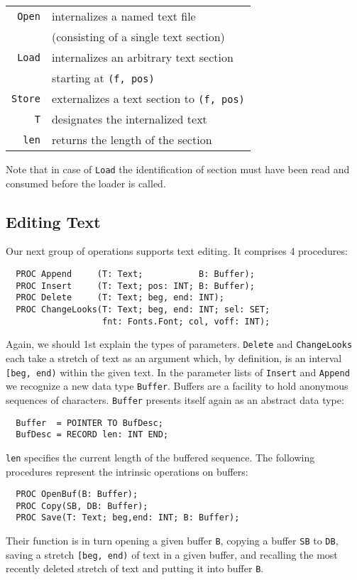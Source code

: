 \begin{table}[h!]
  \begin{tabular}{r l}
    \verb|Open|  & internalizes a named text file \\
                 & (consisting of a single text section) \\
    \verb|Load|  & internalizes an arbitrary text section \\
                 & starting at \verb|(f, pos)| \\
    \verb|Store| & externalizes a text section to \verb|(f, pos)| \\
    \verb|T|     & designates the internalized text \\
    \verb|len|   & returns the length of the section
  \end{tabular}
\end{table}
Note that in case of \verb|Load| the identification of section
must have been read and consumed before the loader is called.

\subsection{Editing Text}
Our next group of operations supports text editing. It comprises 4 procedures:
\begin{verbatim}
  PROC Append     (T: Text;           B: Buffer);
  PROC Insert     (T: Text; pos: INT; B: Buffer);
  PROC Delete     (T: Text; beg, end: INT);
  PROC ChangeLooks(T: Text; beg, end: INT; sel: SET;
                   fnt: Fonts.Font; col, voff: INT);
\end{verbatim}
Again, we should 1st explain the types of parameters.
\verb|Delete| and \verb|ChangeLooks| each take a stretch of text as an argument which,
by definition, is an interval \verb|[beg, end)| within the given text.
In the parameter lists of \verb|Insert| and \verb|Append|
we recognize a new data type \verb|Buffer|.
Buffers are a facility to hold anonymous sequences of characters.
\verb|Buffer| presents itself again as an abstract data type:
\begin{verbatim}
  Buffer  = POINTER TO BufDesc;
  BufDesc = RECORD len: INT END;
\end{verbatim}
\verb|len| specifies the current length of the buffered sequence.
The following procedures represent the intrinsic operations on buffers:
\begin{verbatim}
  PROC OpenBuf(B: Buffer);
  PROC Copy(SB, DB: Buffer);
  PROC Save(T: Text; beg,end: INT; B: Buffer);
\end{verbatim}
Their function is in turn opening a given buffer \verb|B|,
copying a buffer \verb|SB| to \verb|DB|, saving a stretch \verb|[beg, end)|
of text in a given buffer, and recalling the most recently deleted stretch of text
and putting it into buffer \verb|B|.

